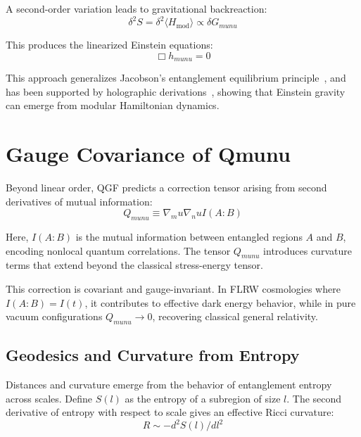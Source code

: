 \documentclass[11pt]{article}
\def\mu{mu}
\def\nu{nu}
\def\_{}
\def\frac#1#2{#1/#2}
\def\texorpdfstring#1#2{#2}
\begin{document}
A second-order variation leads to gravitational backreaction:
\begin{equation}
\delta^2 S = \delta^2 \langle H_{\text{mod}} \rangle \propto \delta G_{\mu\nu}
\end{equation}

This produces the linearized Einstein equations:
\begin{equation}
\Box h_{\mu\nu} = 0
\end{equation}

This approach generalizes Jacobson’s entanglement equilibrium principle~\cite{jacobson2016entanglement}, and has been supported by holographic derivations~\cite{faulkner2014grav}, showing that Einstein gravity can emerge from modular Hamiltonian dynamics.

\section{Gauge Covariance of \texorpdfstring{$Q_{\mu \nu}$}{Q\_munu}}


Beyond linear order, QGF predicts a correction tensor arising from second derivatives of mutual information:
\begin{equation}
Q_{\mu\nu} \equiv \nabla_\mu \nabla_\nu I(A:B)
\end{equation}

Here, \( I(A:B) \) is the mutual information between entangled regions \( A \) and \( B \), encoding nonlocal quantum correlations. The tensor \( Q_{\mu\nu} \) introduces curvature terms that extend beyond the classical stress-energy tensor.

This correction is covariant and gauge-invariant. In FLRW cosmologies where \( I(A:B) = I(t) \), it contributes to effective dark energy behavior, while in pure vacuum configurations \( Q_{\mu\nu} \to 0 \), recovering classical general relativity.

\subsection{Geodesics and Curvature from Entropy}

Distances and curvature emerge from the behavior of entanglement entropy across scales. Define \( S(l) \) as the entropy of a subregion of size \( l \). The second derivative of entropy with respect to scale gives an effective Ricci curvature:
\begin{equation}
R \sim -\frac{d^2 S(l)}{dl^2}
\end{equation}
\end{document}
